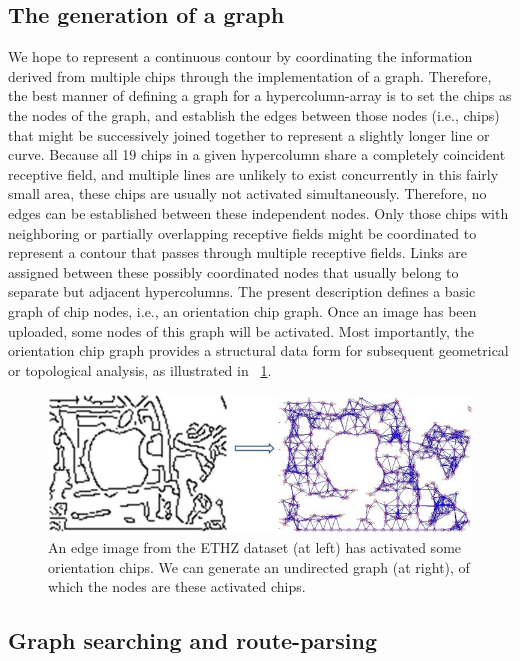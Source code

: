 \documentclass[journal]{IEEEtran}
\begin{document}
\subsection{The generation of a graph}

We hope to represent a continuous contour by coordinating the information derived from multiple chips through the implementation of a graph. 
Therefore, the best manner of defining a graph for a hypercolumn-array is to set the chips as the nodes of the graph, 
and establish the edges between those nodes (i.e., chips) that might be successively joined together to represent a slightly longer line or curve. 
Because all 19 chips in a given hypercolumn share a completely coincident receptive field, 
and multiple lines are unlikely to exist concurrently in this fairly small area, 
these chips are usually not activated simultaneously.
Therefore, no edges can be established between these independent nodes. 
Only those chips with neighboring or partially overlapping receptive fields might be coordinated to represent a contour that passes through multiple receptive fields. 
Links are assigned between these possibly coordinated nodes that usually belong to separate but adjacent hypercolumns. 
The present description defines a basic graph of chip nodes, i.e., an orientation chip graph. 
Once an image has been uploaded, 
some nodes of this graph will be activated. 
Most importantly, the orientation chip graph provides a structural data form for subsequent geometrical or topological analysis, as illustrated in \figurename~\ref{fig:8}.

\begin{figure}[!t]
\centering
\includegraphics[width=0.85\linewidth]{images/fig8.jpg}
\caption{An edge image from the ETHZ dataset (at left) has activated some orientation chips. 
We can generate an undirected graph (at right), of which the nodes are these activated chips.}
\label{fig:8}
\end{figure}

\subsection{Graph searching and route-parsing}
\end{document}
